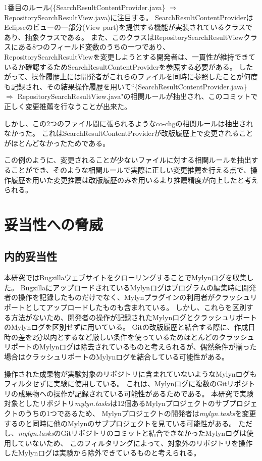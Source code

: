 \documentclass[a4paper]{jsbook}
\begin{document}
1番目のルール(\{SearchResultContentProvider.java\} $\Rightarrow$ RepositorySearchResultView.java)に注目する。
SearchResultContentProviderはEclipseのビューの一部分(View part)を提供する機能が実装されているクラスであり、抽象クラスである。
また、このクラスはRepositorySearchResultViewクラスにある8つのフィールド変数のうちの一つであり、
RepositorySearchResultViewを変更しようとする開発者は、一貫性が維持できているか確認するためSearchResultContentProviderを参照する必要がある。
したがって、操作履歴上には開発者がこれらのファイルを同時に参照したことが何度も記録され、その結果操作履歴を用いて``\{SearchResultContentProvider.java\} $\Rightarrow$ RepositorySearchResultView.java"の相関ルールが抽出され、このコミットで正しく変更推薦を行なうことが出来た。

しかし、この2つのファイル間に張られるようなco-chgの相関ルールは抽出されなかった。
これはSearchResultContentProviderが改版履歴上で変更されることがほとんどなかったためである。

この例のように、変更されることが少ないファイルに対する相関ルールを抽出することができ、そのような相関ルールで実際に正しい変更推薦を行える点で、操作履歴を用いた変更推薦は改版履歴のみを用いるより推薦精度が向上したと考えられる。

\section{妥当性への脅威}
\subsection{内的妥当性}
本研究ではBugzillaウェブサイトをクローリングすることでMylynログを収集した。
BugzillaにアップロードされているMylynログはプログラムの編集時に開発者の操作を記録したものだけでなく、Mylynプラグインの利用者がクラッシュリポートとしてアップロードしたものも含まれている。
しかし、これらを区別する方法がないため、開発者の操作が記録されたMylynログとクラッシュリポートのMylynログを区別せずに用いている。
Gitの改版履歴と結合する際に、作成日時の差を2分以内とするなど厳しい条件を使っているためほとんどのクラッシュリポートのMylynログは除去されているものと考えられるが、偶然条件が揃った場合はクラッシュリポートのMylynログを結合している可能性がある。

操作された成果物が実験対象のリポジトリに含まれていないようなMylynログもフィルタせずに実験に使用している。
これは、Mylynログに複数のGitリポジトリの成果物への操作が記録されている可能性があるためである。
本研究で実験対象としたリポジトリ{\it mylyn.tasks}は12個あるMylynプロジェクトのサブプロジェクトのうちの1つであるため、
Mylynプロジェクトの開発者は{\it mylyn.tasks}を変更するのと同時に他のMylynのサブプロジェクトを見ている可能性がある。
ただし、{\it mylyn.tasks}のGitリポジトリのコミットと結合できなかったMylynログは使用していないため、
このフィルタリングによって、対象外のリポジトリを操作したMylynログは実験から除外できているものと考えられる。
\end{document}
